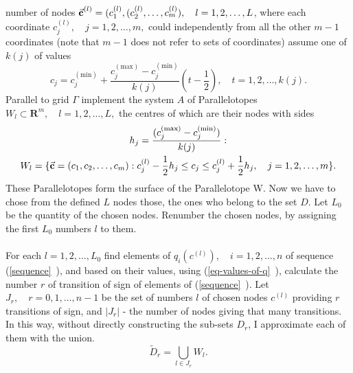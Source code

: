 number of nodes $\vec{\textbf{c}}^{(l)} = (c_{1}^{(l)},(c_{2}^{(l)},\dots,c_{m}^{(l)}),\quad l=1,2,\dots,L$, where each coordinate $c_{j}^{(l)}, \quad j=1,2,\dots,m,$ could independently from all the other $m-1$ coordinates (note that $m-1$ does not refer to sets of coordinates) assume one of $k(j)$ of values
\begin{equation}
c_{j}=c_{j}^{(\text{min})} + \frac{c_{j}^{(\text{max})}-c_{j}^{(\text{min})}}{k(j)}(t-\frac{1}{2}), \quad t=1,2,\dots,k(j).
\end{equation}
Parallel to grid $\Gamma$ implement the system $A$ of Parallelotopes $W_{l} \subset \boldsymbol{R}^{m}, \quad l=1,2,\dots,L,$ the centres of which are their nodes with sides
\begin{gather}
h_{j} = \frac{(c_{j}^{(\text{max})}-c_{j}^{(\text{min})})}{k(j)}: \\
W_{l} = \lbrace \vec{\textbf{c}}=(c_{1},c_{2},\dots,c_{m}):c_{j}^{(l)}-\frac{1}{2} h_{j} \leq c_{j} \leq c_{j}^{(l)}+\frac{1}{2} h_{j}, \quad j=1,2,\dots,m \rbrace .
\end{gather}
These Parallelotopes form the surface of the Parallelotope W. Now we have to chose from the defined $L$ nodes those, the ones who belong to the set $D$. Let $L_{0}$ be the quantity of the chosen nodes. Renumber the chosen nodes, by assigning the first $L_{0}$ numbers $l$ to them. \\
\\
For each $l=1,2,\dots,L_{0}$ find elements of $q_{i}(c^{(l)}), \quad i=1,2,\dots,n$ of sequence (\vref{sequence}~), and based on their values, using (\vref{eq-values-of-q}~), calculate the number $r$ of transition of sign of elements of (\vref{sequence}~). Let $J_{r}, \quad r=0,1,\dots,n-1$ be the set of numbers $l$ of chosen nodes $c^{(l)}$ providing $r$ transitions of sign, and $|J_{r}|$ - the number of nodes giving that many transitions. In this way, without directly constructing the sub-sets $D_{r}$, I approximate each of them with the union. \cite{smith_eggen_andre_2015}
\begin{equation}
\tilde{D}_{r} = \bigcup_{l \in J_{r}} W_{l}. \tag*{(\theequation)\protect\footnotemark}
\end{equation}
\\

